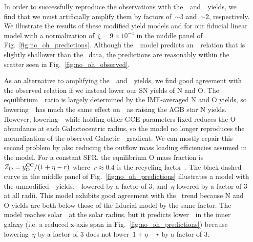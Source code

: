 \documentclass[ms.tex]{subfiles}
\begin{document}
In order to successfully reproduce the observations with
the~\cristallo~and~\ventura~yields, we find that we must artificially amplify
them by factors of~$\sim$3 and~$\sim$2, respectively.
We illustrate the results of these modified yield models and for our fiducial
linear model with a normalization of~$\xi = 9\times10^{-4}$ in the middle panel
of Fig.~\ref{fig:no_oh_predictions}.
Although the~\ventura~model predicts an~\ohno~relation that is slightly
shallower than the~\citet{Dopita2016} data, the predictions are
reasonably within the scatter seen in Fig.~\ref{fig:no_oh_observed}.
\par
As an alternative to amplifying the~\cristallo~and~\ventura~yields, we find
good agreement with the observed relation if we instead lower our SN yields
of N and O.
The equilibrium~\no~ratio is largely determined by the IMF-averaged N and O
yields, so lowering~~has much the same effect on~\no~as raising the AGB
star N yields.
However, lowering~~while holding other GCE parameters fixed reduces the
O abundance at each Galactocentric radius, so the model no longer reproduces
the normalization of the observed Galactic~\oh~gradient.
We can mostly repair this second problem by also reducing the outflow mass
loading efficiencies assumed in the model.
For a constant SFR, the equilibrium O mass fraction
is~$Z_\text{O} = y_\text{O}^\text{CC}/(1 + \eta - r)$ where~$r \approx 0.4$ is the recycling
factor~\citep{Weinberg2017}.
The black dashed curve in the middle panel of Fig.~\ref{fig:no_oh_predictions}
illustrates a model with the unmodified~\cristallo~yields,~~lowered by a
factor of 3, and~$\eta$ lowered by a factor of 3 at all radii.
This model exhibits good agreement with the~\citet{Dopita2016} trend because N
and O yields are both below those of the fiducial model by the same factor.
The model reaches solar~\oh~at the solar radius, but it predicts lower~\oh~in
the inner galaxy (i.e. a reduced x-axis span in
Fig.~\ref{fig:no_oh_predictions}) because lowering~$\eta$ by a factor of 3 does
not lower~$1 + \eta - r$ by a factor of 3.
\end{document}

